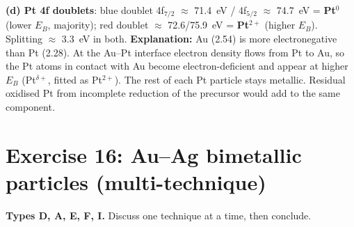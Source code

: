 \textbf{(d) Pt 4f doublets}\readoff: blue doublet 4f$_{7/2}$ $\approx$ \SI{71.4}{eV} / 4f$_{5/2}$ $\approx$ \SI{74.7}{eV} =
\textbf{Pt$^0$} (lower $E_B$, majority); red doublet $\approx$ 72.6/\SI{75.9}{eV} = \textbf{Pt$^{2+}$} (higher $E_B$).
Splitting $\approx$ \SI{3.3}{eV} in both.
\textbf{Explanation:} Au (2.54) is more electronegative than Pt (2.28). At the Au--Pt interface electron density flows from Pt to
Au, so the Pt atoms in contact with Au become electron-deficient and appear at higher $E_B$ (Pt$^{\delta+}$, fitted as Pt$^{2+}$).
The rest of each Pt particle stays metallic. Residual oxidised Pt from incomplete reduction of the precursor would add to
the same component.

\section{Exercise 16: Au--Ag bimetallic particles (multi-technique)}
\textbf{Types D, A, E, F, I.} Discuss one technique at a time, then conclude.
